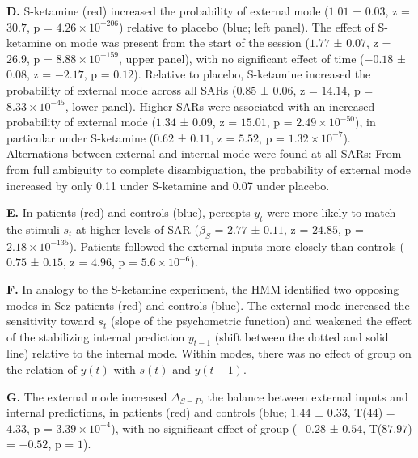 \documentclass[
]{article}
\begin{document}
\textbf{D.} S-ketamine (red) increased the probability of external mode
(\(1.01\) ± \(0.03\), z = \(30.7\), p =
\(\ensuremath{4.26\times 10^{-206}}\)) relative to placebo (blue; left
panel). The effect of S-ketamine on mode was present from the start of
the session (\(1.77\) ± \(0.07\), z = \(26.9\), p =
\(\ensuremath{8.88\times 10^{-159}}\), upper panel), with no significant
effect of time (\(-0.18\) ± \(0.08\), z = \(-2.17\), p = \(0.12\)).
Relative to placebo, S-ketamine increased the probability of external
mode across all SARs (\(0.85\) ± \(0.06\), z = \(14.14\), p =
\(\ensuremath{8.33\times 10^{-45}}\), lower panel). Higher SARs were
associated with an increased probability of external mode (\(1.34\) ±
\(0.09\), z = \(15.01\), p = \(\ensuremath{2.49\times 10^{-50}}\)), in
particular under S-ketamine (\(0.62\) ± \(0.11\), z = \(5.52\), p =
\(\ensuremath{1.32\times 10^{-7}}\)). Alternations between external and
internal mode were found at all SARs: From from full ambiguity to
complete disambiguation, the probability of external mode increased by
only 0.11 under S-ketamine and 0.07 under placebo.

\textbf{E.} In patients (red) and controls (blue), percepts \(y_t\) were
more likely to match the stimuli \(s_t\) at higher levels of SAR
(\(\beta_S\) = \(2.77\) ± \(0.11\), z = \(24.85\), p =
\(\ensuremath{2.18\times 10^{-135}}\)). Patients followed the external
inputs more closely than controls (\(0.75\) ± \(0.15\), z = \(4.96\), p
= \(\ensuremath{5.6\times 10^{-6}}\)).

\textbf{F.} In analogy to the S-ketamine experiment, the HMM identified
two opposing modes in Scz patients (red) and controls (blue). The
external mode increased the sensitivity toward \(s_t\) (slope of the
psychometric function) and weakened the effect of the stabilizing
internal prediction \(y_{t-1}\) (shift between the dotted and solid
line) relative to the internal mode. Within modes, there was no effect
of group on the relation of \(y(t)\) with \(s(t)\) and \(y(t-1)\).

\textbf{G.} The external mode increased \(\Delta_{S-P}\), the balance
between external inputs and internal predictions, in patients (red) and
controls (blue; \(1.44\) ± \(0.33\), T(\(44\)) = \(4.33\), p =
\(\ensuremath{3.39\times 10^{-4}}\)), with no significant effect of
group (\(-0.28\) ± \(0.54\), T(\(87.97\)) = \(-0.52\), p = \(1\)).
\end{document}
